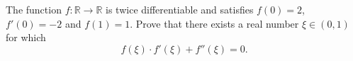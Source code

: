 \documentclass{article}
\begin{document}
	\setlength{\parindent}{0pt}
	The function $f:\mathbb{R}\to\mathbb{R}$ is twice differentiable and satisfies $f(0)=2$, $f'(0)=-2$ and $f(1)=1$. Prove that there exists a real number $\xi\in (0,1)$ for which
	$$f(\xi)\cdot f'(\xi)+f''(\xi)=0.$$
\end{document}
